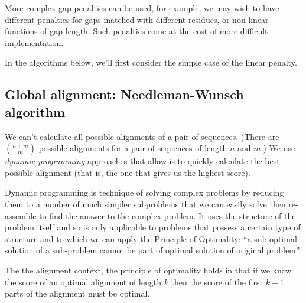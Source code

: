 \documentclass[11pt]{article}
\begin{document}
 
More complex gap penalties can be used, for example, we may wish to have different penalties for gaps matched with different residues, or non-linear functions of gap length.   Such penalties come at the cost of more difficult implementation.

In the algorithms below, we'll first consider the  simple case of  the linear penalty.


\newpage


\subsection{Global alignment: Needleman-Wunsch algorithm}

We can't calculate all possible alignments of a pair of sequences. (There are ${n+m \choose m}$ possible  alignments for a pair of sequences of length $n$ and $m$.) We use {\em dynamic programming}  approaches that allow is to quickly calculate the best possible alignment (that is, the one that gives us the highest score).  

Dynamic programming is technique of solving   complex problems by reducing them to a number of  much simpler subproblems that  we can easily solve then re-assemble to find the answer to the complex problem.  It uses the structure of the problem itself and so is only applicable to problems that possess a certain type of structure and to which we can apply the Principle of Optimality: ``a sub-optimal solution of a sub-problem cannot be part of optimal solution of original problem''.

The the alignment context, the principle of optimality holds in that if we know the score of an  optimal alignment of length $k$ then the score of the first $k-1$ parts of the alignment must be optimal. 
\end{document}
